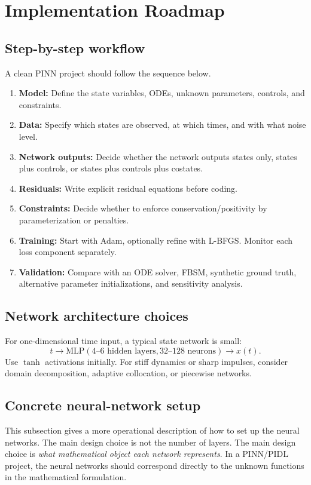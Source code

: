 \documentclass[11pt,a4paper]{article}
\begin{document}
\section{Implementation Roadmap}

\subsection{Step-by-step workflow}
A clean PINN project should follow the sequence below.
\begin{enumerate}[leftmargin=2em]
    \item \textbf{Model:} Define the state variables, ODEs, unknown parameters, controls, and constraints.
    \item \textbf{Data:} Specify which states are observed, at which times, and with what noise level.
    \item \textbf{Network outputs:} Decide whether the network outputs states only, states plus controls, or states plus controls plus costates.
    \item \textbf{Residuals:} Write explicit residual equations before coding.
    \item \textbf{Constraints:} Decide whether to enforce conservation/positivity by parameterization or penalties.
    \item \textbf{Training:} Start with Adam, optionally refine with L-BFGS. Monitor each loss component separately.
    \item \textbf{Validation:} Compare with an ODE solver, FBSM, synthetic ground truth, alternative parameter initializations, and sensitivity analysis.
\end{enumerate}

\subsection{Network architecture choices}
For one-dimensional time input, a typical state network is small:
\begin{equation}
    t \rightarrow \text{MLP}(4\text{--}6\text{ hidden layers}, 32\text{--}128\text{ neurons}) \rightarrow x(t).
\end{equation}
Use $\tanh$ activations initially. For stiff dynamics or sharp impulses, consider domain decomposition, adaptive collocation, or piecewise networks.


\subsection{Concrete neural-network setup}
This subsection gives a more operational description of how to set up the neural networks. The main design choice is not the number of layers. The main design choice is \emph{what mathematical object each network represents}. In a PINN/PIDL project, the neural networks should correspond directly to the unknown functions in the mathematical formulation.
\end{document}
